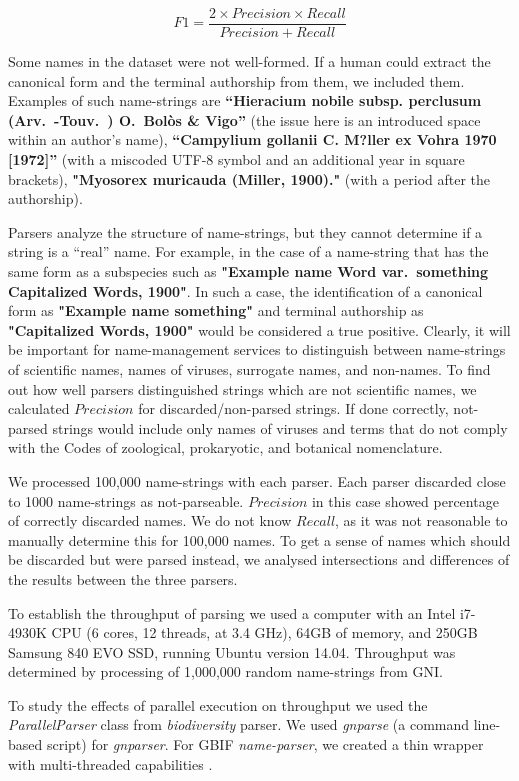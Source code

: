 \documentclass{bmcart}
\begin{document}
\[F1 = \dfrac{2 \times Precision \times Recall}{Precision + Recall}\]


Some names in the dataset were not well-formed. If a human could extract the
canonical form and the terminal authorship from them, we included them.
Examples of such name-strings are \textbf{``Hieracium nobile subsp. perclusum
(Arv.\ -Touv.\ ) O.\ Bolòs \& Vigo''} (the issue here is an introduced space
within an author's name), \textbf{``Campylium gollanii C. M?ller ex Vohra 1970
[1972]''} (with a miscoded UTF-8 symbol and an additional year in square
brackets), \textbf{"Myosorex muricauda (Miller, 1900)."} (with a period after
the authorship).

Parsers analyze the structure of name-strings, but they cannot determine if a
string is a ``real'' name. For example, in the case of a name-string that has
the same form as a subspecies such as \textbf{"Example name Word var.\
something Capitalized Words, 1900"}. In such a case, the identification of a
canonical form as \textbf{"Example name something"} and terminal authorship as
\textbf{"Capitalized Words, 1900"} would be considered a true positive.
Clearly, it will be important for name-management services to distinguish
between name-strings of scientific names, names of viruses, surrogate names,
and non-names. To find out how well parsers distinguished strings which are not
scientific names, we calculated $Precision$ for discarded/non-parsed strings.
If done correctly, not-parsed strings would include only names of viruses and
terms that do not comply with the Codes of zoological, prokaryotic, and
botanical nomenclature.

We processed 100,000 name-strings with each parser.  Each parser discarded
close to 1000 name-strings as not-parseable.  $Precision$ in this case showed
percentage of correctly discarded names.  We do not know $Recall$, as it was
not reasonable to manually determine this for 100,000 names. To get a sense of
names which should be discarded but were parsed instead, we analysed
intersections and differences of the results between the three parsers.

To establish the throughput of parsing we used a computer with an Intel
i7-4930K CPU (6 cores, 12 threads, at 3.4 GHz), 64GB of memory, and 250GB
Samsung 840 EVO SSD, running Ubuntu version 14.04. Throughput was determined by
processing of 1,000,000 random name-strings from GNI.

To study the effects of parallel execution on throughput we used the
\textit{ParallelParser} class from \textit{biodiversity} parser. We used
\textit{gnparse} (a command line-based script) for \textit{gnparser}.
For GBIF \textit{name-parser}, we created a thin wrapper with multi-threaded
capabilities \cite{gbifparser}.
\end{document}
